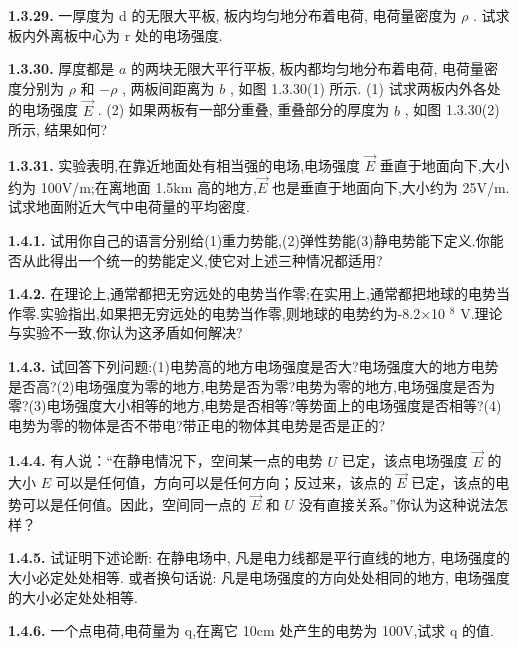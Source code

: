 \vfill

\textbf{1.3.29.} 一厚度为 d 的无限大平板, 板内均匀地分布着电荷, 电荷量密度为 $\rho$ . 试求板内外离板中心为 r 处的电场强度.

\vfill

\newpage
\textbf{1.3.30.} 厚度都是 $a$ 的两块无限大平行平板, 板内都均匀地分布着电荷, 电荷量密度分别为 $\rho$ 和 $-\rho$ , 两板间距离为 $b$ , 如图 1.3.30(1) 所示. (1) 试求两板内外各处的电场强度 $\vec{E}$ . (2) 如果两板有一部分重叠, 重叠部分的厚度为 $b$ , 如图 1.3.30(2) 所示, 结果如何?

\vfill

\textbf{1.3.31.} 实验表明,在靠近地面处有相当强的电场,电场强度 $\vec{E}$ 垂直于地面向下,大小约为 100V/m;在离地面 1.5km 高的地方,$\vec{E}$ 也是垂直于地面向下,大小约为 25V/m.试求地面附近大气中电荷量的平均密度.

\vfill

\newpage
\textbf{1.4.1.} 试用你自己的语言分别给(1)重力势能,(2)弹性势能(3)静电势能下定义.你能否从此得出一个统一的势能定义,使它对上述三种情况都适用?

\vfill

\textbf{1.4.2.} 在理论上,通常都把无穷远处的电势当作零;在实用上,通常都把地球的电势当作零.实验指出,如果把无穷远处的电势当作零,则地球的电势约为-8.2×10 $^{8}$ V.理论与实验不一致,你认为这矛盾如何解决?

\vfill

\newpage
\textbf{1.4.3.} 试回答下列问题:(1)电势高的地方电场强度是否大?电场强度大的地方电势是否高?(2)电场强度为零的地方,电势是否为零?电势为零的地方,电场强度是否为零?(3)电场强度大小相等的地方,电势是否相等?等势面上的电场强度是否相等?(4)电势为零的物体是否不带电?带正电的物体其电势是否是正的?

\vfill

\textbf{1.4.4.} 有人说：“在静电情况下，空间某一点的电势 $U$ 已定，该点电场强度 $\vec{E}$ 的大小 $E$ 可以是任何值，方向可以是任何方向；反过来，该点的 $\vec{E}$ 已定，该点的电势可以是任何值。因此，空间同一点的 $\vec{E}$ 和 $U$ 没有直接关系。”你认为这种说法怎样？

\vfill

\newpage
\textbf{1.4.5.} 试证明下述论断: 在静电场中, 凡是电力线都是平行直线的地方, 电场强度的大小必定处处相等. 或者换句话说: 凡是电场强度的方向处处相同的地方, 电场强度的大小必定处处相等.

\vfill

\textbf{1.4.6.} 一个点电荷,电荷量为 q,在离它 10cm 处产生的电势为 100V,试求 q 的值.

\vfill

